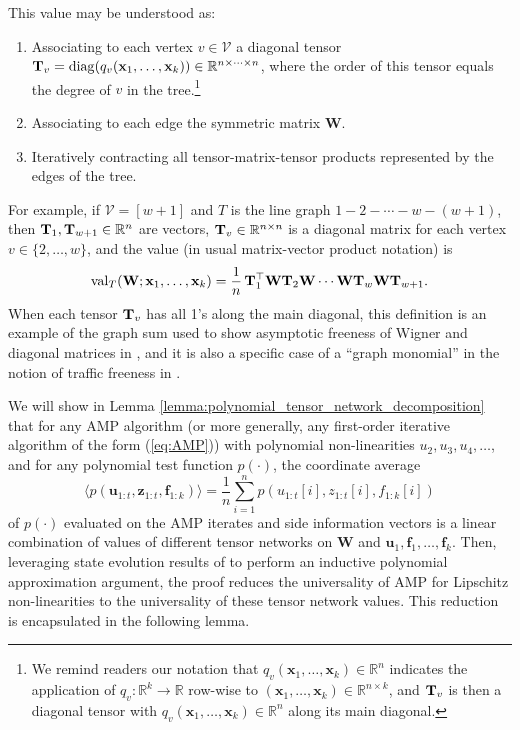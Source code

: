 \documentclass[10pt,reqno]{amsart}
\def\u{\mathbf{u}}
\def\x{\mathbf{x}}
\def\z{\mathbf{z}}
\def\f{\mathbf{f}}
\def\W{\mathbf{W}}
\def\R{\mathbb{R}}
\def\cV{\mathcal{V}}
\def\diag{\operatorname{diag}}
\def\val{\operatorname{val}}
\begin{document}
This value may be understood as:
\begin{enumerate}
\item Associating to each vertex $v \in \cV$ a diagonal tensor
$\bT_v=\diag(q_v(\x_1,\ldots,\x_k)) \in \R^{n \times \cdots \times n}$,
where the order of this tensor equals the degree of $v$ in the tree.\footnote{
We remind readers our notation that
$q_v(\x_1,\ldots,\x_k) \in \R^n$ indicates the
application of $q_v:\R^k \to \R$ row-wise to $(\x_1,\ldots,\x_k) \in \R^{n
\times k}$, and $\mathbf{T}_v$ is then a diagonal tensor with
$q_v(\x_1,\ldots,\x_k) \in \R^n$ along its main diagonal.}
\item Associating to each edge the symmetric matrix $\W$.
\item Iteratively contracting all tensor-matrix-tensor products represented by
the edges of the tree.
\end{enumerate}
For example, if $\cV=[w+1]$ and $T$ is the line graph
$1-2-\cdots-w-(w+1)$, then
$\bT_1,\bT_{w+1} \in \R^n$ are vectors, $\bT_v \in \R^{n \times n}$
is a diagonal matrix for each vertex $v \in \{2,\ldots,w\}$,
and the value (in usual matrix-vector product notation) is
\[\val_T(\W;\x_1,\ldots,\x_k)=\frac{1}{n}\,\bT_1^\top
\W\bT_2\W \cdots \W\bT_w\W\bT_{w+1}.\]
When each tensor $\mathbf{T}_v$ has all 1's along the main diagonal, this
definition is an example of the graph sum used to show asymptotic freeness of
Wigner and diagonal matrices in \cite{mingo2012sharp,mingo2017free},
and it is also a specific case of a ``graph monomial'' in the notion of
traffic freeness in \cite{male2020traffic}.

We will show in Lemma
\ref{lemma:polynomial_tensor_network_decomposition}
that for any AMP algorithm (or more generally, any
first-order iterative algorithm of the form (\ref{eq:AMP}))
with polynomial non-linearities $u_2,u_3,u_4,\ldots$,
and for any polynomial test function $p(\cdot)$, the coordinate average
\[\langle p(\u_{1:t},\z_{1:t},\f_{1:k}) \rangle=
\frac{1}{n}\sum_{i=1}^n p(u_{1:t}[i],z_{1:t}[i],f_{1:k}[i])\]
of $p(\cdot)$ evaluated on the AMP iterates and side information vectors
is a linear combination of values of different tensor networks on $\W$ and
$\u_1,\f_1,\ldots,\f_k$. Then,
leveraging state evolution results of \cite{fan2022approximate}
to perform an inductive polynomial approximation argument, the proof reduces
the universality of AMP for Lipschitz non-linearities
to the universality of these tensor
network values. This reduction is encapsulated in the following lemma.
\end{document}
